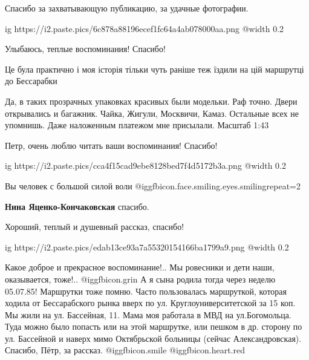 \begin{itemize}
\begin{itemize}
\end{itemize} %

Спасибо за захватывающую
публикацию, за удачные фотографии.


\ifcmt
  ig https://i2.paste.pics/6c878a88196ecef1fc64a4ab078000aa.png
  @width 0.2
\fi


Улыбаюсь, теплые воспоминания! Спасибо!

Це була практично і моя історія тільки чуть раніше теж їздили на цій маршрутці до Бессарабки


Да, в таких прозрачных упаковках красивых были модельки. Раф точно. Двери
открывались и багажник. Чайка, Жигули, Москвичи, Камаз. Остальные всех не
упомнишь. Даже наложенным платежом мне присылали. Масштаб 1:43


Петр, очень люблю читать ваши воспоминания! Спасибо!


\ifcmt
  ig https://i2.paste.pics/cca4f15cad9ebe8128bed7f4d5172b3a.png
  @width 0.2
\fi

Вы человек с большой силой воли  @igg{fbicon.face.smiling.eyes.smiling}{repeat=2} 

\textbf{Нина Яценко-Кончаковская} спасибо.

Хороший, теплый и душевный рассказ, спасибо!


\ifcmt
  ig https://i2.paste.pics/edab13ce93a7a55320154166ba1799a9.png
  @width 0.2
\fi


Какое доброе и прекрасное воспоминание!.. Мы ровесники и дети наши,
оказывается, тоже!..  @igg{fbicon.grin}  А я сына родила тогда через неделю 05.07.85! Маршрутки
тоже помню. Часто пользовалась маршруткой, которая ходила от Бессарабского
рынка вверх по ул. Круглоуниверситетской за 15 коп. Мы жили на ул. Бассейная, 11.
Мама моя работала в МВД на ул.Богомольца. Туда можно было попасть или на этой
маршрутке, или пешком в др. сторону по ул. Бассейной и наверх мимо Октябрьской
больницы (сейчас Александровская). Спасибо, Пётр, за рассказ.  @igg{fbicon.smile} @igg{fbicon.heart.red}



\end{itemize}

